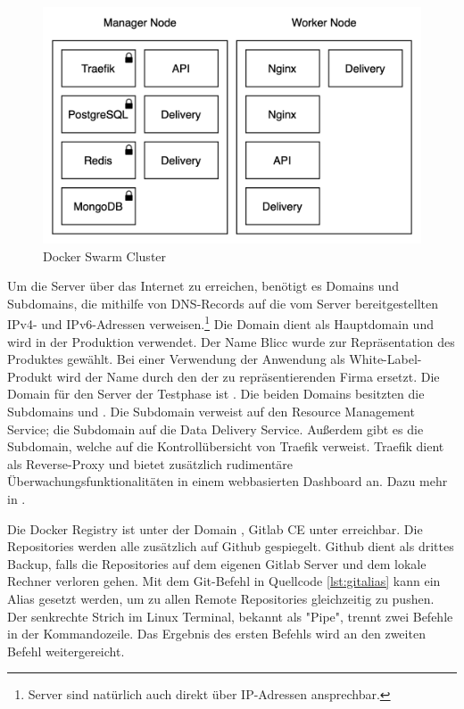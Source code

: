 \begin{figure}
    \begin{center}
    \includegraphics[scale=0.2]{img/abbildungen/Cluster}
    \end{center}
    \caption{Docker Swarm Cluster}
    \label{figure:dockerswarmcluster}
\end{figure}


Um die Server über das Internet zu erreichen, benötigt es Domains
und Subdomains, die mithilfe von DNS-Records auf die vom Server bereitgestellten
IPv4- und IPv6-Adressen verweisen.\footnote{Server sind natürlich auch
direkt über IP-Adressen ansprechbar.} Die Domain  dient als
Hauptdomain und wird in der Produktion verwendet. Der Name Blicc
wurde zur Repräsentation des Produktes gewählt. Bei einer Verwendung der Anwendung
als White-Label-Produkt wird der Name durch den der
zu repräsentierenden Firma ersetzt. Die Domain für den
Server der Testphase ist . Die beiden Domains besitzten die
Subdomains  und . Die Subdomain  verweist auf
den Resource Management Service; die Subdomain  auf die Data Delivery Service.
Außerdem gibt es die  Subdomain, welche auf die Kontrollübersicht von Traefik
verweist. Traefik dient als Reverse-Proxy und bietet zusätzlich rudimentäre
Überwachungsfunktionalitäten in einem webbasierten Dashboard an.
Dazu mehr in .

Die Docker Registry ist unter der Domain , Gitlab CE
unter  erreichbar. Die Repositories werden alle zusätzlich
auf Github gespiegelt. Github dient als drittes Backup, falls die Repositories auf dem
eigenen Gitlab Server und dem lokale Rechner verloren gehen. Mit dem Git-Befehl in
Quellcode \ref{lst:gitalias} kann ein Alias gesetzt werden, um zu allen Remote Repositories
gleichzeitig zu pushen. Der senkrechte Strich im Linux Terminal, bekannt als "Pipe",
trennt zwei Befehle in der Kommandozeile. Das Ergebnis des ersten Befehls wird
an den zweiten Befehl weitergereicht.

